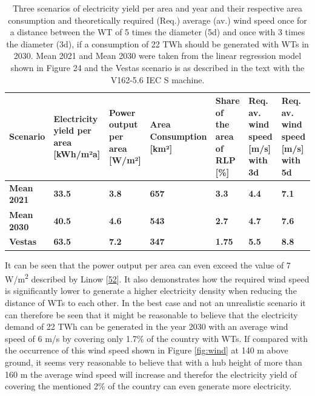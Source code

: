 \documentclass[a4paper,11pt]{article}
\begin{document}
\begin{table}[H]

\caption{\label{tab:table2}Three scenarios of electricity yield per area and year and their respective area consumption 
  and theoretically required (Req.) average (av.) wind speed once for a distance between the WT of 5 times 
  the diameter (5d)  and once with 3 times the diameter (3d), if a consumption of 22 TWh should be generated 
  with WTs in 2030. Mean 2021 and Mean 2030 were taken from the linear regression model shown in Figure 24 
  and the Vestas scenario is as described in the text with the V162-5.6 IEC S machine.}
\centering
\begin{tabular}[t]{>{\raggedright\arraybackslash}p{1.8cm}>{\raggedright\arraybackslash}p{1.8cm}>{\raggedright\arraybackslash}p{1.8cm}>{\raggedright\arraybackslash}p{1.8cm}>{\raggedright\arraybackslash}p{1.8cm}>{\raggedright\arraybackslash}p{1.8cm}>{\raggedright\arraybackslash}p{1.8cm}}
\toprule
Scenario & Electricity yield per area [kWh/m²a] & Power output per area [W/m²] & Area Consumption [km²] & Share of the area of RLP [\%] & Req. av. wind speed [m/s] with 3d & Req. av. wind speed [m/s] with 5d\\
\midrule
\textbf{Mean 2021} & \textbf{33.5} & \textbf{3.8} & \textbf{657} & \textbf{3.3} & \textbf{4.4} & \textbf{7.1}\\
\midrule
\textbf{Mean 2030} & \textbf{40.5} & \textbf{4.6} & \textbf{543} & \textbf{2.7} & \textbf{4.7} & \textbf{7.6}\\
\midrule
\textbf{Vestas} & \textbf{63.5} & \textbf{7.2} & \textbf{347} & \textbf{1.75} & \textbf{5.5} & \textbf{8.8}\\
\midrule
\bottomrule
\end{tabular}
\end{table}
It can be seen that the power output per area can even exceed the value of 7 W/m\textsuperscript{2} described by Linow {[}\protect\hyperlink{ref-SvenLinow.2020}{52}{]}. It also demonstrates how the required wind speed is significantly lower to generate a higher electricity density when reducing the distance of WTs to each other. In the best case and not an unrealistic scenario it can therefore be seen that it might be reasonable to believe that the electricity demand of 22 TWh can be generated in the year 2030 with an average wind speed of 6 m/s by covering only 1.7\% of the country with WTs. If compared with the occurrence of this wind speed shown in Figure \ref{fig:wind} at 140 m above ground, it seems very reasonable to believe that with a hub height of more than 160 m the average wind speed will increase and therefor the electricity yield of covering the mentioned 2\% of the country can even generate more electricity.
\end{document}
